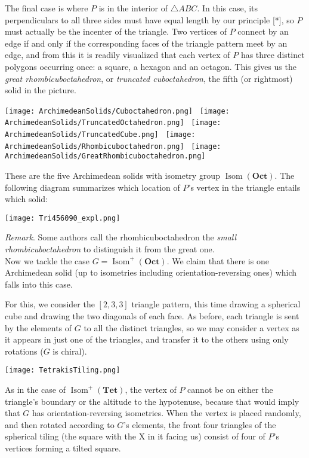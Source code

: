 \documentclass[leqno]{book}
\begin{document}
The final case is where $P$ is in the interior of $\triangle ABC$.  In this case, its perpendiculars to all three sides must have equal length by our principle [*], so $P$ must actually be the incenter of the triangle.  Two vertices of $P$ connect by an edge if and only if the corresponding faces of the triangle pattern meet by an edge, and from this it is readily visualized that each vertex of $P$ has three distinct polygons occurring once: a square, a hexagon and an octagon.  This gives us the \emph{great rhombicuboctahedron}, or \emph{truncated cuboctahedron}, the fifth (or rightmost) solid in the picture.
\begin{center}
\texttt{[image: ArchimedeanSolids/Cuboctahedron.png]}~
\texttt{[image: ArchimedeanSolids/TruncatedOctahedron.png]}~
\texttt{[image: ArchimedeanSolids/TruncatedCube.png]}~
\texttt{[image: ArchimedeanSolids/Rhombicuboctahedron.png]}~
\texttt{[image: ArchimedeanSolids/GreatRhombicuboctahedron.png]}
\end{center}
These are the five Archimedean solids with isometry group $\operatorname{Isom}(\mathbf{Oct})$.  The following diagram summarizes which location of $P$'s vertex in the triangle entails which solid:
\begin{center}
\texttt{[image: Tri456090\_expl.png]}
\end{center}
\emph{Remark}. Some authors call the rhombicuboctahedron the \emph{small rhombicuboctahedron} to distinguish it from the great one.\\

\noindent Now we tackle the case $G=\operatorname{Isom}^+(\mathbf{Oct})$.  We claim that there is one Archimedean solid (up to isometries including orientation-reversing ones) which falls into this case.

For this, we consider the $[2,3,3]$ triangle pattern, this time drawing a spherical cube and drawing the two diagonals of each face.  As before, each triangle is sent by the elements of $G$ to all the distinct triangles, so we may consider a vertex as it appears in just one of the triangles, and transfer it to the others using only rotations ($G$ is chiral).
\begin{center}
\texttt{[image: TetrakisTiling.png]}
\end{center}
As in the case of $\operatorname{Isom}^+(\mathbf{Tet})$, the vertex of $P$ cannot be on either the triangle's boundary or the altitude to the hypotenuse, because that would imply that $G$ has orientation-reversing isometries.  When the vertex is placed randomly, and then rotated according to $G$'s elements, the front four triangles of the spherical tiling (the square with the X in it facing us) consist of four of $P$'s vertices forming a tilted square.
\end{document}
